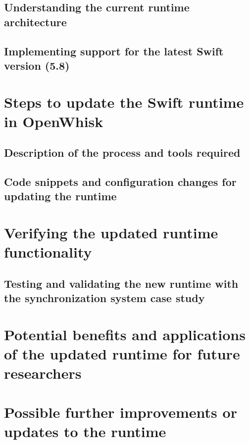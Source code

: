 \subsection{Understanding the current runtime architecture}

\subsection{Implementing support for the latest Swift version (5.8)}

\section{Steps to update the Swift runtime in OpenWhisk}

\subsection{Description of the process and tools required}

\subsection{Code snippets and configuration changes for updating the runtime}

\section{Verifying the updated runtime functionality}

\subsection{Testing and validating the new runtime with the synchronization system case study}

\section{Potential benefits and applications of the updated runtime for future researchers}

\section{Possible further improvements or updates to the runtime}

